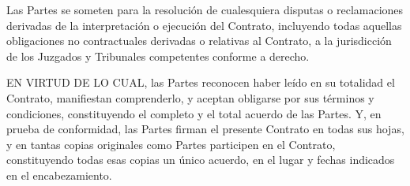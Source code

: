 \documentclass[a4paper,11pt]{report}
\begin{document}
	Las Partes se someten para la resolución de cualesquiera disputas o
	reclamaciones derivadas de la interpretación o ejecución del Contrato,
	incluyendo todas aquellas obligaciones no contractuales derivadas o
	relativas al Contrato, a la jurisdicción de los Juzgados y Tribunales
	competentes conforme a derecho.
	
	EN VIRTUD DE LO CUAL, las Partes reconocen haber leído en su totalidad
	el Contrato, manifiestan comprenderlo, y aceptan obligarse por sus
	términos y condiciones, constituyendo el completo y el total acuerdo de
	las Partes. Y, en prueba de conformidad, las Partes firman el presente
	Contrato en todas sus hojas, y en tantas copias originales como Partes
	participen en el Contrato, constituyendo todas esas copias un único
	acuerdo, en el lugar y fechas indicados en el encabezamiento.
\end{document}

